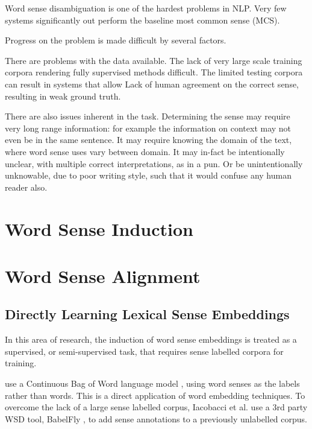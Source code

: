 \documentclass[12pt,parskip]{komatufte}
\begin{document}
Word sense disambiguation is one of the hardest problems in NLP.
Very few systems significantly out perform the baseline most common sense (MCS).

Progress on the problem is made difficult by several factors.

There are problems with the data available.
The lack of very large scale training corpora rendering fully supervised methods difficult.
The limited testing corpora can result in systems that allow 
Lack of human agreement on the correct sense, resulting in weak ground truth.

There are also issues inherent in the task.
Determining the sense may require very long range information:
for example the information on context may not even be in the same sentence.
It may require knowing the domain of the text, where word sense uses vary between domain.
It may in-fact be intentionally unclear, with multiple correct interpretations, as in a pun.
Or be unintentionally unknowable, due to poor writing style, such that it would confuse any human reader also.





\section{Word Sense Induction}
\section{Word Sense Alignment}



\subsection{Directly Learning Lexical Sense Embeddings}
In this area of research, the induction of word sense embeddings is treated as a supervised, or semi-supervised task, that requires sense labelled corpora for training.

 use a Continuous Bag of Word language model \parencite{mikolov2013efficient}, using word senses as the labels rather than words.
This is a direct application of word embedding techniques.
To overcome the lack of a large sense labelled corpus, Iacobacci et al. use a 3rd party WSD tool, BabelFly \cite{Moroetal:14tacl}, to add sense annotations to a previously unlabelled corpus. 
\end{document}
